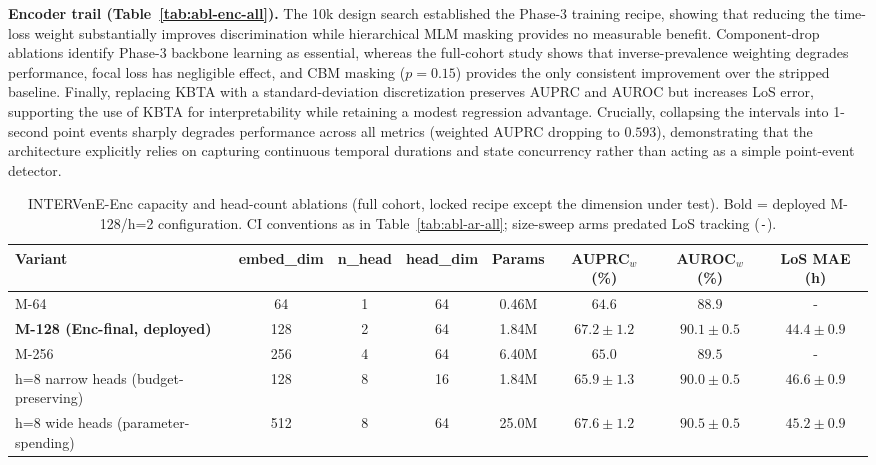 \textbf{Encoder trail (Table~\ref{tab:abl-enc-all}).}
The 10k design search established the Phase-3 training recipe, showing that reducing the time-loss weight substantially improves discrimination while hierarchical MLM masking provides no measurable benefit. Component-drop ablations identify Phase-3 backbone learning as essential, whereas the full-cohort study shows that inverse-prevalence weighting degrades performance, focal loss has negligible effect, and CBM masking ($p{=}0.15$) provides the only consistent improvement over the stripped baseline. Finally, replacing KBTA with a standard-deviation discretization preserves AUPRC and AUROC but increases LoS error, supporting the use of KBTA for interpretability while retaining a modest regression advantage. Crucially, collapsing the intervals into 1-second point events sharply degrades performance across all metrics (weighted AUPRC dropping to $0.593$), demonstrating that the architecture explicitly relies on capturing continuous temporal durations and state concurrency rather than acting as a simple point-event detector.

\begin{table}[h]
\caption{INTERVenE-Enc capacity and head-count ablations (full cohort, locked recipe except the dimension under test). Bold = deployed M-128/h=2 configuration. CI conventions as in Table~\ref{tab:abl-ar-all}; size-sweep arms predated LoS tracking (\texttt{-}).}
\label{tab:abl-enc-capacity}
\centering
\small
\setlength{\tabcolsep}{4pt}
\begin{tabular}{lccccccc}
\toprule
Variant & embed\_dim & n\_head & head\_dim & Params & AUPRC$_w$ (\%) & AUROC$_w$ (\%) & LoS MAE (h) \\
\midrule
M-64                                  & 64   & 1 & 64 & 0.46M & $64.6$                    & $88.9$                    & -                       \\
\textbf{M-128 (Enc-final, deployed)}  & 128  & 2 & 64 & 1.84M & $\mathbf{67.2 \pm 1.2}$ & $\mathbf{90.1 \pm 0.5}$ & $\mathbf{44.4 \pm 0.9}$ \\
M-256                                 & 256  & 4 & 64 & 6.40M & $65.0$                    & $89.5$                    & -                       \\
\midrule
h=8 narrow heads (budget-preserving)  & 128  & 8 & 16 & 1.84M & $65.9 \pm 1.3$          & $90.0 \pm 0.5$          & $46.6 \pm 0.9$          \\
h=8 wide heads (parameter-spending)   & 512  & 8 & 64 & 25.0M & $67.6 \pm 1.2$          & $90.5 \pm 0.5$          & $45.2 \pm 0.9$          \\
\bottomrule
\end{tabular}
\end{table}

